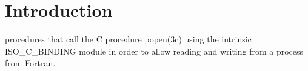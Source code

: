 \hypertarget{index_Introduction}{}\section{Introduction}\label{index_Introduction}
procedures that call the C procedure popen(3c) using the intrinsic I\+S\+O\+\_\+\+C\+\_\+\+B\+I\+N\+D\+I\+NG module in order to allow reading and writing from a process from Fortran.

 